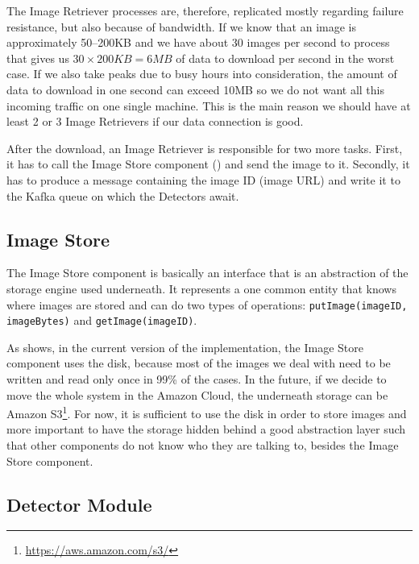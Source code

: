 The Image Retriever processes are, therefore, replicated mostly regarding
failure resistance, but also because of bandwidth. If we know that an image is
approximately 50--200KB and we have about 30 images per second to process that
gives us \(30 \times 200KB = 6MB\) of data to download per second in the worst
case. If we also take peaks due to busy hours into consideration, the amount
of data to download in one second can exceed 10MB so we do not want all this
incoming traffic on one single machine. This is the main reason we should have at
least 2 or 3 Image Retrievers if our data connection is good.

After the download, an Image Retriever is responsible for two more tasks.
First, it has to call the Image Store component
() and send the image to it.
Secondly, it has to produce a message containing the image ID (image URL) and
write it to the Kafka queue on which the Detectors await.

\subsection{Image Store}
\label{sub-sec:im-store}

The Image Store component is basically an interface that is an abstraction of
the storage engine used underneath. It represents a one common entity that
knows where images are stored and can do two types of operations:
\texttt{putImage(imageID, imageBytes)} and \texttt{getImage(imageID)}.

As  shows, in the current version of the
implementation, the Image Store component uses the disk, because most of the
images we deal with
need to be written and read only once in 99\% of the cases. In the future, if we
decide to move the whole system in the Amazon Cloud, the underneath storage
can be Amazon S3\footnote{\url{https://aws.amazon.com/s3/}}. For now, it is
sufficient to use the disk in order to store images and more important to
have the storage hidden behind a good abstraction layer such that other
components do not know who they are talking to, besides the Image Store
component.

\subsection{Detector Module}
\label{sub-sec:detector}

